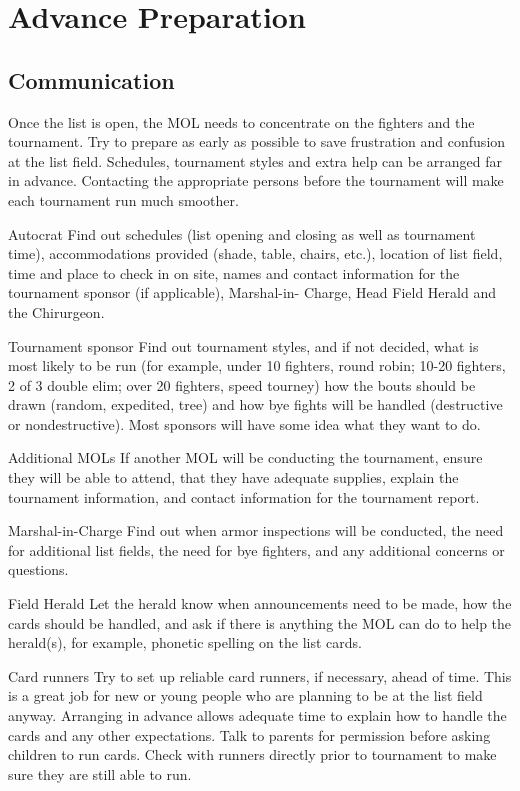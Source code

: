 \documentclass{article}
\begin{document}
\section{Advance Preparation}
\subsection{Communication}

Once the list is open, the MOL needs to concentrate on the fighters and the tournament. Try to prepare as
early as possible to save frustration and confusion at the list field. Schedules, tournament styles and extra
help can be arranged far in advance. Contacting the appropriate persons before the tournament will make
each tournament run much smoother.

Autocrat Find out schedules (list opening and closing as well as tournament
time), accommodations provided (shade, table, chairs, etc.), location
of list field, time and place to check in on site, names and contact
information for the tournament sponsor (if applicable), Marshal-in-
Charge, Head Field Herald and the Chirurgeon.

Tournament sponsor Find out tournament styles, and if not decided, what is most likely to
be run (for example, under 10 fighters, round robin; 10-20 fighters, 2
of 3 double elim; over 20 fighters, speed tourney) how the bouts
should be drawn (random, expedited, tree) and how bye fights will
be handled (destructive or nondestructive). Most sponsors will have
some idea what they want to do.

Additional MOLs If another MOL will be conducting the tournament, ensure they will
be able to attend, that they have adequate supplies, explain the
tournament information, and contact information for the tournament
report.

Marshal-in-Charge Find out when armor inspections will be conducted, the need for
additional list fields, the need for bye fighters, and any additional
concerns or questions.

Field Herald Let the herald know when announcements need to be made, how the
cards should be handled, and ask if there is anything the MOL can
do to help the herald(s), for example, phonetic spelling on the list
cards.

Card runners Try to set up reliable card runners, if necessary, ahead of time. This
is a great job for new or young people who are planning to be at the
list field anyway. Arranging in advance allows adequate time to
explain how to handle the cards and any other expectations. Talk to
parents for permission before asking children to run cards. Check
with runners directly prior to tournament to make sure they are still
able to run.
\end{document}
